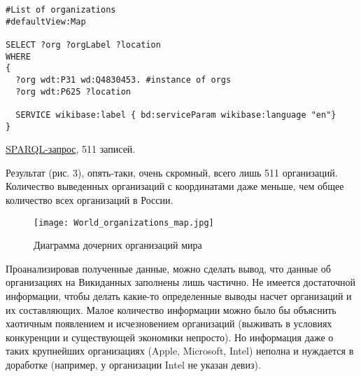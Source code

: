 \begin{lstlisting}[language=SPARQL,label=orgsmap,caption=Карта организаций мира]
#List of organizations 
#defaultView:Map

SELECT ?org ?orgLabel ?location
WHERE
{
  ?org wdt:P31 wd:Q4830453. #instance of orgs
  ?org wdt:P625 ?location

  SERVICE wikibase:label { bd:serviceParam wikibase:language "en"}
}
\end{lstlisting}

\href{https://query.wikidata.org/#%23List%20of%20organisations%20%0A%23defaultView%3AMap%0A%0ASELECT%20%3Forg%20%3ForgLabel%20%3Flocation%0AWHERE%0A%7B%0A%20%20%3Forg%20wdt%3AP31%20wd%3AQ4830453.%20%23instance%20of%20orgs%0A%20%20%3Forg%20wdt%3AP625%20%3Flocation%0A%0A%20%20SERVICE%20wikibase%3Alabel%20%7B%20bd%3AserviceParam%20wikibase%3Alanguage%20%22en%22%7D%0A%7D}{SPARQL-запрос}, 511 записей.

Результат (рис. 3), опять-таки, очень скромный, всего лишь 511 организаций. Количество выведенных организаций с координатами даже меньше, чем общее количество всех организаций в России.

\begin{figure}[h]
	\texttt{[image: World\_organizations\_map.jpg]}
	\centering
	\caption{Диаграмма дочерних организаций мира}
	\centering
\end{figure}

Проанализировав полученные данные, можно сделать вывод, что данные об организациях на Викиданных заполнены лишь частично. Не имеется достаточной информации, чтобы делать какие-то определенные выводы насчет организаций и их составляющих. Малое количество информации можно было бы объяснить хаотичным появлением и исчезновением организаций (выживать в условиях конкуренции и существующей экономики непросто). Но информация даже о таких крупнейших организациях (Apple, Microsoft, Intel) неполна и нуждается в доработке (например, у организации Intel не указан девиз).